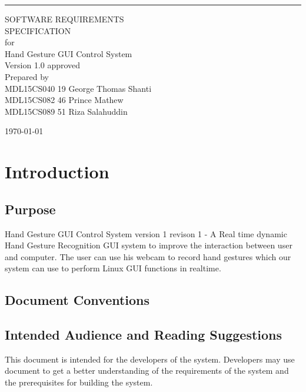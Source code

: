 \documentclass{scrreprt}
\date{}
\def\myversion{1.0 }
\begin{document}
\begin{flushright}
    \rule{16cm}{5pt}\vskip1cm
    \begin{bfseries}
        \Huge{SOFTWARE REQUIREMENTS\\ SPECIFICATION}\\
        \vspace{1.9cm}
        for\\
        \vspace{1.9cm}
        Hand Gesture GUI Control System\\
        \vspace{1.9cm}
        \LARGE{Version \myversion approved}\\
        \vspace{1.9cm}
        Prepared by \\MDL15CS040 19 George Thomas Shanti
        \\MDL15CS082 46 Prince Mathew
        \\MDL15CS089 51 Riza Salahuddin
        
        \vspace{1.4cm}
        \today\\
    \end{bfseries}
\end{flushright}

\tableofcontents


\chapter{Introduction}

\section{Purpose}
Hand Gesture GUI Control System version 1 revison 1 - A Real time dynamic Hand Gesture Recognition GUI system to improve the interaction between user and computer. The user can use his webcam to record hand gestures which our system can use to perform Linux GUI functions in realtime.

\section{Document Conventions}


\section{Intended Audience and Reading Suggestions}
This document is intended for the developers of the system. Developers may use document to get a better understanding of the requirements of the system and the prerequisites for building the system.
\end{document}
